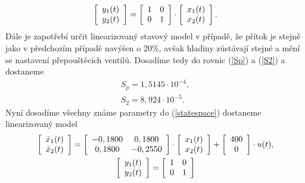 \documentclass[12pt,a4paper]{article}
\begin{document}
\begin{enumerate}[I.]
\begin{enumerate}[1.]
\begin{gather}
			\\
			\left[
			\begin{array}{c c}
			y_1(t) \\
			y_2(t) 
			\end{array}
			\right]
			= 
			\left[\begin{array}{c c}
			1 & 0\\
			0 & 1
			\end{array}\right]
			\cdot \left[\begin{array}{c}
			x_1(t) \\
			x_2(t)
			\end{array}\right]. \label{ss_1}
			\end{gather}
			Dále je zapotřebí určit linearizovaný stavový model v případě, že přítok je stejně jako v předchozím případě navýšen o 20\%, avšak hladiny zůstávají stejné a mění se nastavení přepouštěcích ventilů. Dosadíme tedy do rovnic (\ref{Sp}) a (\ref{S2}) a dostaneme
			\begin{gather*}
			S_p = 1{,}5145\cdot 10^{-4},\\
			S_2 = 8{,}924\cdot 10^{-5}.
			\end{gather*}
			Nyní dosadíme všechny známe parametry do (\ref{statespace}) dostaneme linearizovaný model
			\begin{gather}
			\left[
			\begin{array}{c c}
			\dot{x}_1(t) \\
			\dot{x}_2(t) 
			\end{array}
			\right]
			= 
			\left[\begin{array}{c c}
			-0,1800 & 0,1800\\
			0,1800 & -0,2550
			\end{array}\right]
			\cdot \left[\begin{array}{c}
			x_1(t) \\
			x_2(t)
			\end{array}\right]
			+ \left[\begin{array}{c}
			400\\
			0
			\end{array}\right]
			\cdot u(t), \nonumber
			\\
			\left[
			\begin{array}{c c}
			y_1(t) \\
			y_2(t) 
			\end{array}
			\right]
			= 
			\left[\begin{array}{c c}
			1 & 0\\
			0 & 1
			\end{array}\right]

\end{gather}
\end{enumerate}
\end{enumerate}
\end{document}
